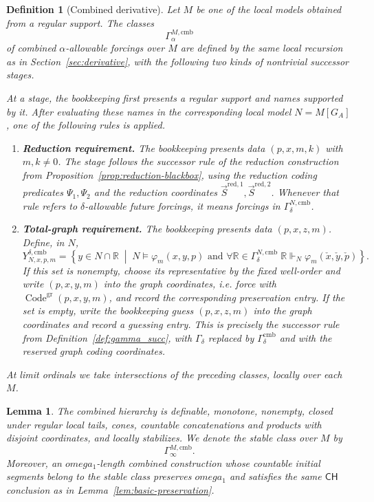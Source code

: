 \documentclass{article}
\newtheorem{lemma}[theorem]{Lemma}
\newtheorem{definition}[theorem]{Definition}
\theoremstyle{remark}
\theoremstyle{plain}
\newcommand{\forceR}{\mathbb{R}}
\newcommand{\Code}{\operatorname{Code}}
\newcommand{\CH}{\mathsf{CH}}
\newcommand{\Real}{\mathbb{R}}
\def\omega{omega}%
\begin{document}
\begin{definition}[Combined derivative]\label{def:combined-derivative}
Let $M$ be one of the local models obtained from a regular support. The classes
\[
   \Gamma^{M,\mathrm{cmb}}_\alpha
\]
of \emph{combined $\alpha$-allowable forcings over $M$} are defined by the same
local recursion as in Section~\ref{sec:derivative}, with the following two kinds
of nontrivial successor stages.

At a stage, the bookkeeping first presents a regular support and names supported
by it. After evaluating these names in the corresponding local model
$N=M[G_A]$, one of the following rules is applied.

\begin{enumerate}[label=\textup{(\alph*)}]
\item \textbf{Reduction requirement.}
The bookkeeping presents data $(p,x,m,k)$ with $m,k\neq0$. The stage follows the
successor rule of the reduction construction from
Proposition~\ref{prop:reduction-blackbox}, using the reduction coding predicates
$\Psi_1,\Psi_2$ and the reduction coordinates
$\vec S^{\mathrm{red},1},\vec S^{\mathrm{red},2}$. Whenever that rule refers to
$\delta$-allowable future forcings, it means forcings in
$\Gamma^{N,\mathrm{cmb}}_\delta$.

\item \textbf{Total-graph requirement.}
The bookkeeping presents data $(p,x,z,m)$. Define, in $N$,
\[
   Y^{\delta,\mathrm{cmb}}_{N,x,p,m}
   =
   \left\{y\in N\cap\Real\;\middle|\;
   N\models\varphi_m(x,y,p)
   \text{ and }
   \forall\forceR\in\Gamma^{N,\mathrm{cmb}}_\delta\;
      \forceR\Vdash_N\varphi_m(\check x,\check y,\check p)
   \right\}.
\]
If this set is nonempty, choose its representative by the fixed well-order and
write $(p,x,y,m)$ into the graph coordinates, i.e. force with
$\Code^{\mathrm{gr}}(p,x,y,m)$, and record the corresponding preservation
entry. If the set is empty, write the bookkeeping guess $(p,x,z,m)$ into the
graph coordinates and record a guessing entry. This is precisely the successor
rule from Definition~\ref{def:gamma_succ}, with
$\Gamma_\delta$ replaced by $\Gamma^{\mathrm{cmb}}_\delta$ and with the reserved
graph coding coordinates.
\end{enumerate}
At limit ordinals we take intersections of the preceding classes, locally over
each $M$.
\end{definition}

\begin{lemma}\label{lem:combined-closure}
The combined hierarchy is definable, monotone, nonempty, closed under regular
local tails, cones, countable concatenations and products with disjoint
coordinates, and locally stabilizes. We denote the stable class over $M$ by
\[
   \Gamma^{M,\mathrm{cmb}}_\infty.
\]
Moreover, an $\omega_1$-length combined construction whose countable initial
segments belong to the stable class preserves $\omega_1$ and satisfies the same
$\CH$ conclusion as in Lemma~\ref{lem:basic-preservation}.
\end{lemma}
\end{document}
